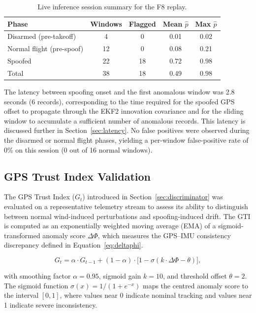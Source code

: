\documentclass[electronics,article,accept,moreauthors]{Definitions/mdpi}
\begin{document}
\begin{table}[H]
\caption{Live inference session summary for the F8 replay.\label{tab:live_inference}}
\begin{tabularx}{\textwidth}{lCCCC}
\toprule
\textbf{Phase} & \textbf{Windows} & \textbf{Flagged} & \textbf{Mean $\hat{p}$} & \textbf{Max $\hat{p}$} \\
\midrule
Disarmed (pre-takeoff)  & 4  & 0 & 0.01 & 0.02 \\
Normal flight (pre-spoof) & 12 & 0 & 0.08 & 0.21 \\
Spoofed                  & 22 & 18 & 0.72 & 0.98 \\
\midrule
Total                    & 38 & 18 & 0.49 & 0.98 \\
\bottomrule
\end{tabularx}
\end{table}

The latency between spoofing onset and the first anomalous window was 2.8 seconds (6 records), corresponding to the time required for the spoofed GPS offset to propagate through the EKF2 innovation covariance and for the sliding window to accumulate a sufficient number of anomalous records. This latency is discussed further in Section~\ref{sec:latency}. No false positives were observed during the disarmed or normal flight phases, yielding a per-window false-positive rate of 0\% on this session (0 out of 16 normal windows).

\subsection{GPS Trust Index Validation}
\label{sec:gti_validation}

The GPS Trust Index ($G_t$) introduced in Section~\ref{sec:discriminator} was evaluated on a representative telemetry stream to assess its ability to distinguish between normal wind-induced perturbations and spoofing-induced drift. The GTI is computed as an exponentially weighted moving average (EMA) of a sigmoid-transformed anomaly score $\Delta\Phi$, which measures the GPS--IMU consistency discrepancy defined in Equation~\ref{eq:deltaphi}.

\begin{equation}
G_t = \alpha \cdot G_{t-1} + (1 - \alpha) \cdot \bigl[1 - \sigma(k \cdot \Delta\Phi - \theta)\bigr],
\label{eq:gti_update}
\end{equation}

with smoothing factor $\alpha = 0.95$, sigmoid gain $k = 10$, and threshold offset $\theta = 2$. The sigmoid function $\sigma(x) = 1/(1 + e^{-x})$ maps the centred anomaly score to the interval $[0, 1]$, where values near 0 indicate nominal tracking and values near 1 indicate severe inconsistency.
\end{document}
